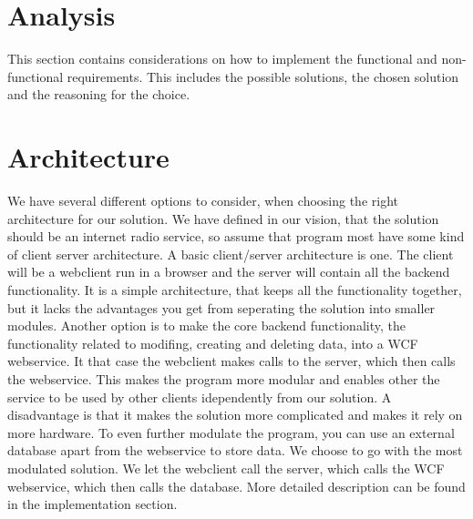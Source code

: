 \documentclass[a4paper,11pt,report]{article}
\begin{document}
\section{Analysis}
This section contains considerations on how to implement the functional and non-functional requirements. This includes the possible solutions, the chosen solution and the reasoning for the choice.

\section{Architecture}
We have several different options to consider, when choosing the right architecture for our solution. We have defined in our vision, that the solution should be an internet radio service, so assume that program most have some kind of client server architecture. A basic client/server architecture is one. The client will be a webclient run in a browser and the server will contain all the backend functionality. It is a simple architecture, that keeps all the functionality together, but it lacks the advantages you get from seperating the solution into smaller modules. Another option is to make the core backend functionality, the functionality related to modifing, creating and deleting data, into a WCF webservice. It that case the webclient makes calls to the server, which then calls the webservice. This makes the program more modular and enables other the service to be used by other clients idependently from our solution. A disadvantage is that it makes the solution more complicated and makes it rely on more hardware. To even further modulate the program, you can use an external database apart from the webservice to store data. We choose to go with the most modulated solution. We let the webclient call the server, which calls the WCF webservice, which then calls the database. More detailed description can be found in the implementation section.
\end{document}
